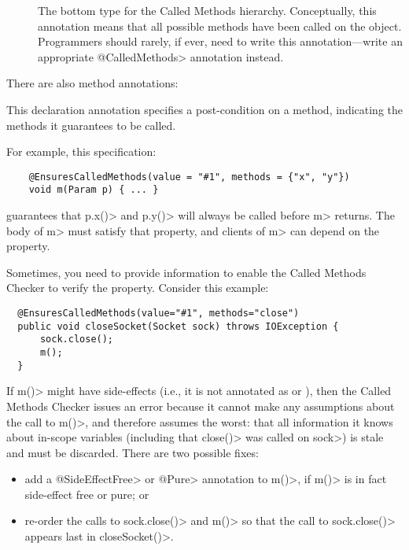 \begin{description}
\item[]
  The bottom type for the Called Methods hierarchy. Conceptually, this annotation
  means that all possible methods have been called on the object. Programmers should rarely,
  if ever, need to write this annotation---write an appropriate \<@CalledMethods> annotation
  instead.

\end{description}

There are also method annotations:

\begin{description}
\label{called-methods-ensurescalledmethods}
\item[\refqualclass{checker/calledmethods/qual}{EnsuresCalledMethods}]
  This declaration annotation specifies a post-condition on a method, indicating the methods it
  guarantees to be called.

  For example, this specification:

  \begin{Verbatim}
    @EnsuresCalledMethods(value = "#1", methods = {"x", "y"})
    void m(Param p) { ... }
  \end{Verbatim}

  guarantees that \<p.x()> and \<p.y()> will always be called before \<m> returns.
  The body of \<m> must satisfy that property, and clients of \<m> can depend on the property.

  Sometimes, you need to provide information to enable the Called Methods
  Checker to verify the property.
  Consider this example:
  \begin{Verbatim}
  @EnsuresCalledMethods(value="#1", methods="close")
  public void closeSocket(Socket sock) throws IOException {
      sock.close();
      m();
  }
  \end{Verbatim}

  If \<m()> might have side-effects (i.e., it is not annotated as
   or ),
  then the Called Methods Checker issues an error because
  it cannot make any assumptions about the call to \<m()>, and therefore assumes
  the worst: that all information it knows about in-scope variables (including
  that \<close()> was called on \<sock>) is stale and must be discarded.
  There are two possible fixes:

  \begin{itemize}
  \item add a \<@SideEffectFree> or \<@Pure> annotation to \<m()>, if \<m()> is
    in fact side-effect free or pure; or
  \item re-order the calls to \<sock.close()> and \<m()> so that the call
    to \<sock.close()> appears last in \<closeSocket()>.
  \end{itemize}


\end{description}
